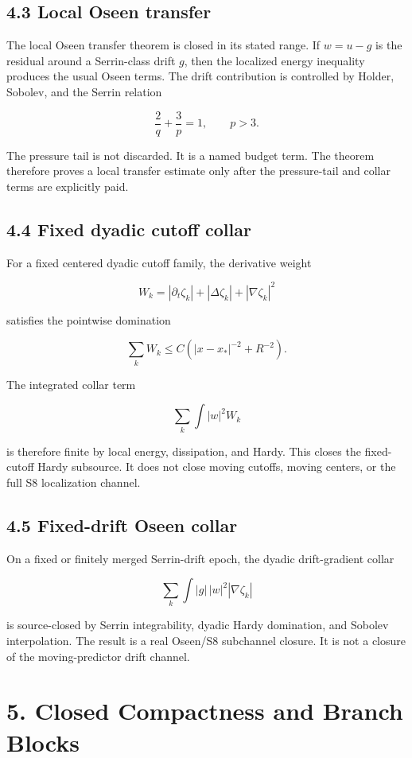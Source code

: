\documentclass[11pt]{article}
\begin{document}
\subsection*{4.3 Local Oseen transfer}

The local Oseen transfer theorem is closed in its stated range. If \(w=u-g\) is the residual around a Serrin-class drift \(g\), then the localized energy inequality produces the usual Oseen terms. The drift contribution is controlled by Holder, Sobolev, and the Serrin relation

\[\frac2q+\frac3p=1,\qquad p>3.\]

The pressure tail is not discarded. It is a named budget term. The theorem therefore proves a local transfer estimate only after the pressure-tail and collar terms are explicitly paid.

\subsection*{4.4 Fixed dyadic cutoff collar}

For a fixed centered dyadic cutoff family, the derivative weight

\[W_k=|\partial_t\zeta_k|+|\Delta\zeta_k|+|\nabla\zeta_k|^2\]

satisfies the pointwise domination

\[\sum_k W_k \le C(|x-x_*|^{-2}+R^{-2}).\]

The integrated collar term

\[\sum_k\int |w|^2 W_k\]

is therefore finite by local energy, dissipation, and Hardy. This closes the fixed-cutoff Hardy subsource. It does not close moving cutoffs, moving centers, or the full S8 localization channel.

\subsection*{4.5 Fixed-drift Oseen collar}

On a fixed or finitely merged Serrin-drift epoch, the dyadic drift-gradient collar

\[\sum_k\int |g|\,|w|^2|\nabla\zeta_k|\]

is source-closed by Serrin integrability, dyadic Hardy domination, and Sobolev interpolation. The result is a real Oseen/S8 subchannel closure. It is not a closure of the moving-predictor drift channel.

\section*{5. Closed Compactness and Branch Blocks}
\end{document}
